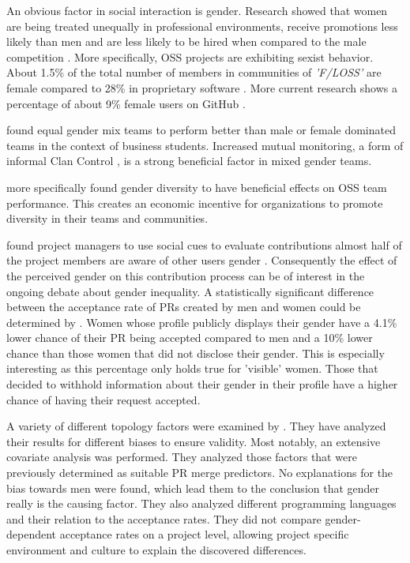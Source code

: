 An obvious factor in social interaction is gender. Research showed that women are being treated unequally in professional environments, receive promotions less likely than men and are less likely to be hired when compared to the male competition \cite{Davison2000225, doi:10.1177/0149206310374774}.
More specifically, \ac{OSS} projects are exhibiting sexist behavior. About 1.5\% of the total number of members in communities of \emph{'\ac{F/LOSS}'} are female compared to 28\% in proprietary software \cite{flosspols-gender:2005}. More current research shows a percentage of about 9\% female users on GitHub \cite{Vasilescu:2015:GTD:2702123.2702549}.

\citeauthor{10.2307/23443867} found equal gender mix teams to perform better than male or female dominated teams in the context of business students. Increased mutual monitoring, a form of informal Clan Control \cite{doi:10.1287/orsc.7.1.1}, is a strong beneficial factor in mixed gender teams.

\citeauthor{Vasilescu:2015:GTD:2702123.2702549} more specifically found gender diversity to have beneficial effects on \ac{OSS} team performance. This creates an economic incentive for organizations to promote diversity in their teams and communities.

\citeauthor{Tsay:2014:IST:2568225.2568315} found project managers to use social cues to evaluate contributions almost half of the project members are aware of other users gender \cite{Vasilescu:2015:GTD:2702123.2702549}. Consequently the effect of the perceived gender on this contribution process can be of interest in the ongoing debate about gender inequality.  A statistically significant difference between the acceptance rate of \ac{PR}s created by men and women could be determined by \citeauthor{genderdiff:2016}. Women whose profile publicly displays their gender have a 4.1\% lower chance of their \ac{PR} being accepted compared to men and a 10\% lower chance than those women that did not disclose their gender. This is especially interesting as this percentage only holds true for 'visible'
women. Those that decided to withhold information about their gender in their profile have a higher chance of having their request accepted.


A variety of different topology factors were examined by \citeauthor{genderdiff:2016}. They have analyzed their results for different biases to ensure validity. Most notably, an extensive covariate analysis was performed. They analyzed those factors that were previously determined as suitable \ac{PR} merge predictors. No explanations for the bias towards men were found, which lead them to the conclusion that gender really is the causing factor. They also analyzed different programming languages and their relation to the acceptance rates. They did not compare gender-dependent acceptance rates on a project level, allowing project specific environment and culture to explain the discovered differences.

